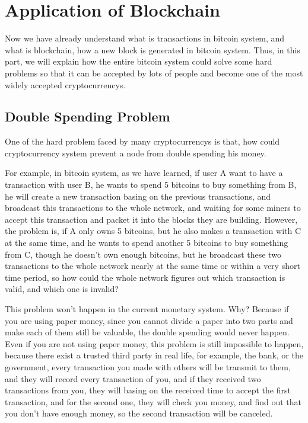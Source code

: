\documentclass[12pt,a4paper]{article}
\begin{document}
\section{Application of Blockchain}

Now we have already understand what is transactions in bitcoin system, and what is blockchain, how a new block is generated in bitcoin system. Thus, in this part, we will explain how the entire bitcoin system could solve some hard problems so that it can be accepted by lots of people and become one of the most widely accepted cryptocurrencys.

\subsection{Double Spending Problem}
One of the hard problem faced by many cryptocurrencys is that, how could cryptocurrency system
 prevent a node from double spending his money.
 
 For example, in bitcoin system, as we have learned, if user A want to have a transaction with user B, he wants to spend 5 bitcoins to buy something from B, he will create a new transaction basing on the previous transactions, and broadcast this transactions to the whole network, and waiting for some miners to accept this transaction and packet it into the blocks they are building. However, the problem is, if A only owns 5 bitcoins, but he also makes a transaction with C at the same time, and he wants to spend another 5 bitcoins to buy something from C, though he doesn't own enough bitcoins, but he broadcast these two transactions to the whole network nearly at the same time or within a very short time period, so how could the whole network figures out which transaction is valid, and which one is invalid? 
 
 This problem won't happen in the current monetary system. Why? Because if you are using paper money, since you cannot divide a paper into two parts and make each of them still be valuable, the double spending would never happen. Even if you are not using paper money, this problem is still impossible to happen, because there exist a trusted third party in real life, for example, the bank, or the government, every transaction you made with others will be transmit to them, and they will record every transaction of you, and if they received two transactions from you, they will basing on the received time to accept the first transaction, and for the second one, they will check you money, and find out that you don't have enough money, so the second transaction will be canceled.
 
\end{document}
